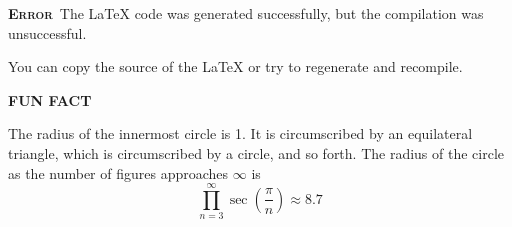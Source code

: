 \documentclass{article}
\begin{document}
\begin{tcolorbox}[colback=red!10,colframe=red!80,width=\textwidth,arc=3mm,auto outer arc]
\centering
{\Huge \textbf{\textsc{Error}}}\
\Large The LaTeX code was generated successfully, but the compilation was unsuccessful.
\end{tcolorbox}


\noindent You can copy the source of the LaTeX or try to regenerate and recompile.
\vspace{2.5em}
\begin{tcolorbox}[colback=white,colframe=black,boxrule=1pt,width=\textwidth,arc=3mm,auto outer arc]
    \begin{center}
        \textbf{FUN FACT}
    \end{center}
\begin{center}
	
\end{center}
\vspace{1.5em}
\noindent The radius of the innermost circle is 1.  It is circumscribed by an 
equilateral triangle, which is circumscribed by a circle, and so forth.  
The radius of the circle as the number of figures approaches $\infty$ is 
\[
  \prod_{n=3}^\infty \sec\left(\frac{\pi}{n}\right) \approx 8.7
\]
\end{tcolorbox}
\end{document}
